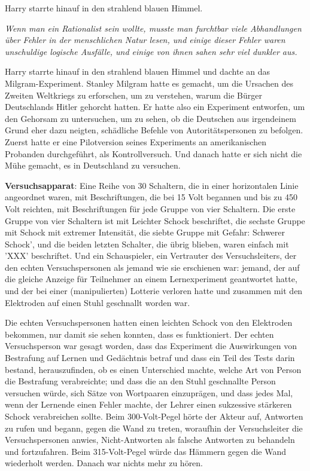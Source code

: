 Harry starrte hinauf in den strahlend blauen Himmel.

\emph{Wenn man ein Rationalist sein wollte, musste man furchtbar viele
Abhandlungen über Fehler in der menschlichen Natur lesen, und einige dieser
Fehler waren unschuldige logische Ausfälle, und einige von ihnen sahen sehr viel
dunkler aus.}

Harry starrte hinauf in den strahlend blauen Himmel und dachte an das
Milgram-Experiment. Stanley Milgram hatte es gemacht, um die Ursachen des
Zweiten Weltkriegs zu erforschen, um zu verstehen, warum die Bürger Deutschlands
Hitler gehorcht hatten. Er hatte also ein Experiment entworfen, um den Gehorsam
zu untersuchen, um zu sehen, ob die Deutschen aus irgendeinem Grund eher dazu
neigten, schädliche Befehle von Autoritätspersonen zu befolgen. Zuerst hatte er
eine Pilotversion seines Experiments an amerikanischen Probanden durchgeführt,
als Kontrollversuch. Und danach hatte er sich nicht die Mühe gemacht, es in
Deutschland zu versuchen.

\textbf{Versuchsapparat}: Eine Reihe von 30 Schaltern, die in einer horizontalen
Linie angeordnet waren, mit Beschriftungen, die bei \glqq{}15 Volt\grqq{}
begannen und bis zu \glqq{}450 Volt\grqq{} reichten, mit Beschriftungen für jede
Gruppe von vier Schaltern. Die erste Gruppe von vier Schaltern ist mit \glqq
Leichter Schock\grqq{} beschriftet, die sechste Gruppe mit \glqq{}Schock mit
extremer Intensität\grqq{}, die siebte Gruppe mit \glqq{}Gefahr: Schwerer
Schock', und die beiden letzten Schalter, die übrig blieben, waren einfach mit
'XXX' beschriftet. Und ein Schauspieler, ein Vertrauter des Versuchsleiters, der
den echten Versuchspersonen als jemand wie sie erschienen war: jemand, der auf
die gleiche Anzeige für Teilnehmer an einem Lernexperiment geantwortet hatte,
und der bei einer (manipulierten) Lotterie verloren hatte und zusammen mit den
Elektroden auf einen Stuhl geschnallt worden war.

Die echten Versuchspersonen hatten einen leichten Schock von den Elektroden
bekommen, nur damit sie sehen konnten, dass es funktioniert. Der echten
Versuchsperson war gesagt worden, dass das Experiment die Auswirkungen von
Bestrafung auf Lernen und Gedächtnis betraf und dass ein Teil des Tests darin
bestand, herauszufinden, ob es einen Unterschied machte, welche Art von Person
die Bestrafung verabreichte; und dass die an den Stuhl geschnallte Person
versuchen würde, sich Sätze von Wortpaaren einzuprägen, und dass jedes Mal, wenn
der \glqq{}Lernende\grqq{} einen Fehler machte, der \glqq{}Lehrer\grqq{} einen
sukzessive stärkeren Schock verabreichen sollte. Beim 300-Volt-Pegel hörte der
Akteur auf, Antworten zu rufen und begann, gegen die Wand zu treten, woraufhin
der Versuchsleiter die Versuchspersonen anwies, Nicht-Antworten als falsche
Antworten zu behandeln und fortzufahren. Beim 315-Volt-Pegel würde das Hämmern
gegen die Wand wiederholt werden. Danach war nichts mehr zu hören.

